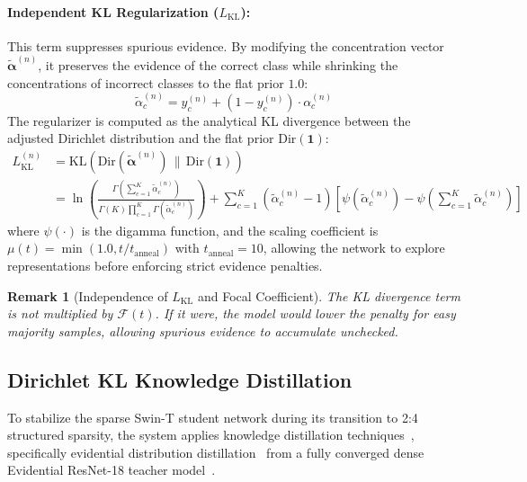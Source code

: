 \documentclass[11pt, a4paper]{article}
\newcommand{\Dir}{\text{Dir}}
\newcommand{\KL}{\text{KL}}
\newtheorem{remark}{Remark}
\begin{document}
\paragraph{Independent KL Regularization ($L_{\text{KL}}$):}
This term suppresses spurious evidence. By modifying the concentration vector $\tilde{\bm{\alpha}}^{(n)}$, it preserves the evidence of the correct class while shrinking the concentrations of incorrect classes to the flat prior $1.0$:
\begin{equation}
    \tilde{\alpha}_c^{(n)} = y_c^{(n)} + (1 - y_c^{(n)}) \cdot \alpha_c^{(n)}
\end{equation}
The regularizer is computed as the analytical KL divergence between the adjusted Dirichlet distribution and the flat prior $\Dir(\bm{1})$:
\begin{align}
    L_{\text{KL}}^{(n)} &= \KL\!\left(\Dir(\tilde{\bm{\alpha}}^{(n)}) \,\|\, \Dir(\bm{1})\right) \nonumber \\
    &= \ln \left( \frac{\Gamma\left(\sum_{c=1}^K \tilde{\alpha}_c^{(n)}\right)}{\Gamma(K) \prod_{c=1}^K \Gamma(\tilde{\alpha}_c^{(n)})} \right) + \sum_{c=1}^K (\tilde{\alpha}_c^{(n)} - 1)\left[\psi(\tilde{\alpha}_c^{(n)}) - \psi\!\left(\sum_{c=1}^K \tilde{\alpha}_c^{(n)}\right)\right] \label{eq:kl_loss_n}
\end{align}
where $\psi(\cdot)$ is the digamma function, and the scaling coefficient is $\mu(t) = \min(1.0, t / t_{\text{anneal}})$ with $t_{\text{anneal}} = 10$, allowing the network to explore representations before enforcing strict evidence penalties.

\begin{remark}[Independence of $L_{\text{KL}}$ and Focal Coefficient]
The KL divergence term is not multiplied by $\mathcal{F}(t)$. If it were, the model would lower the penalty for easy majority samples, allowing spurious evidence to accumulate unchecked.
\end{remark}

\subsection{Dirichlet KL Knowledge Distillation}\label{subsec:distillation}

To stabilize the sparse Swin-T student network during its transition to 2:4 structured sparsity, the system applies knowledge distillation techniques~\cite{hinton2015distilling, gou2021knowledge}, specifically evidential distribution distillation~\cite{malinin2019ensemble} from a fully converged dense Evidential ResNet-18 teacher model~\cite{he2016deep}.
\end{document}
